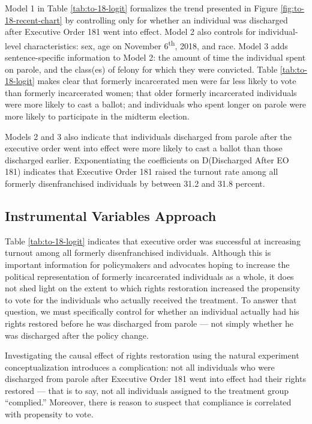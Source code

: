 \documentclass[12pt,]{article}
\begin{document}


Model 1 in Table \ref{tab:to-18-logit} formalizes the trend presented in Figure \ref{fig:to-18-recent-chart} by controlling only for whether an individual was discharged after Executive Order 181 went into effect. Model 2 also controls for individual-level characteristics: sex, age on November 6\textsuperscript{th}, 2018, and race. Model 3 adds sentence-specific information to Model 2: the amount of time the individual spent on parole, and the class(es) of felony for which they were convicted. Table \ref{tab:to-18-logit} makes clear that formerly incarcerated men were far less likely to vote than formerly incarcerated women; that older formerly incarcerated individuals were more likely to cast a ballot; and individuals who spent longer on parole were more likely to participate in the midterm election.

Models 2 and 3 also indicate that individuals discharged from parole after the executive order went into effect were more likely to cast a ballot than those discharged earlier. Exponentiating the coefficients on D(Discharged After EO 181) indicates that Executive Order 181 raised the turnout rate among all formerly disenfranchised individuals by between 31.2 and 31.8 percent.

\hypertarget{instrumental-variables-approach}{%
\subsection*{Instrumental Variables Approach}\label{instrumental-variables-approach}}

Table \ref{tab:to-18-logit} indicates that executive order was successful at increasing turnout among all formerly disenfranchised individuals. Although this is important information for policymakers and advocates hoping to increase the political representation of formerly incarcerated individuals as a whole, it does not shed light on the extent to which rights restoration increased the propensity to vote for the individuals who actually received the treatment. To answer that question, we must specifically control for whether an individual actually had his rights restored before he was discharged from parole --- not simply whether he was discharged after the policy change.

Investigating the causal effect of rights restoration using the natural experiment conceptualization introduces a complication: not all individuals who were discharged from parole after Executive Order 181 went into effect had their rights restored --- that is to say, not all individuals assigned to the treatment group ``complied.'' Moreover, there is reason to suspect that compliance is correlated with propensity to vote.
\end{document}
